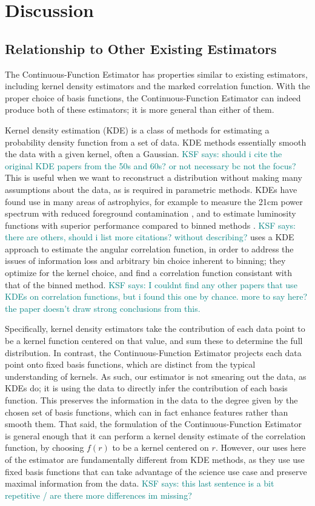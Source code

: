 \documentclass[modern]{aastex62}
\newcommand{\Est}{The Continuous-Function Estimator\xspace}
\newcommand{\est}{the Continuous-Function Estimator\xspace}
\newcommand{\KSF}[1]{\textcolor{teal}{KSF says: #1}}
\begin{document}
\section{Discussion} \label{sec:discuss}

\subsection{Relationship to Other Existing Estimators}
\label{sec:otherest}

\Est has properties similar to existing estimators, including kernel density estimators and the marked correlation function.
With the proper choice of basis functions, \est can indeed produce both of these estimators; it is more general than either of them.

Kernel density estimation (KDE) is a class of methods for estimating a probability density function from a set of data.
KDE methods essentially smooth the data with a given kernel, often a Gaussian.
\KSF{should i cite the original KDE papers from the 50s and 60s? or not necessary bc not the focus?}
This is useful when we want to reconstruct a distribution without making many assumptions about the data, as is required in parametric methods.
KDEs have found use in many areas of astrophyics, for example to measure the 21cm power spectrum with reduced foreground contamination \citep{Trott2019}, and to estimate luminosity functions with superior performance compared to binned methods \citep{Yuan2020}.
\KSF{there are others, should i list more citations? without describing?}
\cite{Hatfield2016} uses a KDE approach to estimate the angular correlation function, in order to address the issues of information loss and arbitrary bin choice inherent to binning; they optimize for the kernel choice, and find a correlation function consistant with that of the binned method.
\KSF{I couldnt find any other papers that use KDEs on correlation functions, but i found this one by chance. more to say here? the paper doesn't draw strong conclusions from this.}

Specifically, kernel density estimators take the contribution of each data point to be a kernel function centered on that value, and sum these to determine the full distribution.
In contrast, \est projects each data point onto fixed basis functions, which are distinct from the typical understanding of kernels.
As such, our estimator is not smearing out the data, as KDEs do; it is using the data to directly infer the contribution of each basis function.
This preserves the information in the data to the degree given by the chosen set of basis functions, which can in fact enhance features rather than smooth them.
That said, the formulation of \est is general enough that it can perform a kernel density estimate of the correlation function, by choosing $f(r)$ to be a kernel centered on $r$.
However, our uses here of the estimator are fundamentally different from KDE methods, as they use use fixed basis functions that can take advantage of the science use case and preserve maximal information from the data.
\KSF{this last sentence is a bit repetitive / are there more differences im missing?}
\end{document}
